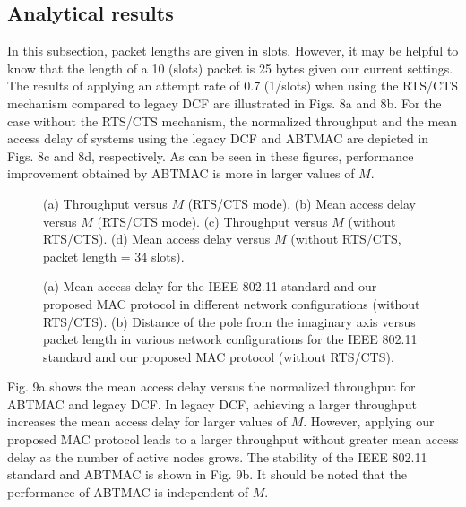 \documentclass[10pt,twocolumn,oneside,submit]{JCNtran}
\begin{document}
\subsection{Analytical results}
\par In this subsection, packet lengths are given in slots. However, it may be helpful to know that the length of a 10 (slots) packet is 25 bytes given our current settings. The results of applying an attempt rate of 0.7 (1/slots) when using the RTS/CTS mechanism compared to legacy DCF are illustrated in Figs. 8a and 8b. For the case without the RTS/CTS mechanism, the normalized throughput and the mean access delay of systems using the legacy DCF and ABTMAC are depicted in Figs. 8c and 8d, respectively. As can be seen in these figures, performance improvement obtained by ABTMAC is more in larger values of $M$.
\begin{figure*}[!t]
\begin{center}
\epsfxsize=16cm \leavevmode{} \caption{(a) Throughput versus $M$ (RTS/CTS mode). (b) Mean access delay versus $M$ (RTS/CTS mode). (c) Throughput versus $M$ (without RTS/CTS). (d) Mean access delay versus $M$ (without RTS/CTS, packet length = 34 slots).} \label{fig:8}
\end{center}
\end{figure*}
\begin{figure*}[t]
\begin{center}
\epsfxsize=16cm \leavevmode{} \caption{(a) Mean access delay for the IEEE 802.11 standard and our proposed MAC protocol in different network configurations (without RTS/CTS). (b) Distance of the pole from the imaginary axis versus packet length in various network configurations for the IEEE 802.11 standard and our proposed MAC protocol (without RTS/CTS).} \label{fig:9}
\end{center}
\end{figure*}
\par Fig. 9a shows the mean access delay versus the normalized throughput for ABTMAC and legacy DCF. In legacy DCF, achieving a larger throughput increases the mean access delay for larger values of $M$. However, applying our proposed MAC protocol leads to a larger throughput without greater mean access delay as the number of active nodes grows. The stability of the IEEE 802.11 standard and ABTMAC is shown in Fig. 9b. It should be noted that the performance of ABTMAC is independent of $M$.
\end{document}
